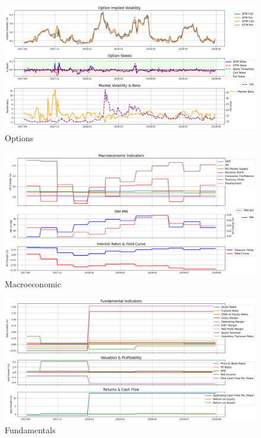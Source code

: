 \documentclass[8pt]{scrartcl}
\begin{document}
\begin{figure}[H]
    \centering
    \includegraphics[width=1\linewidth]{judge_reviews/AMZN_M_gpt-4o-mini/2018-09-01/judge_Option_Implied_Volatility.png}
    \caption{Options}
\end{figure}

\begin{figure}[H]
    \centering
    \includegraphics[width=1\linewidth]{judge_reviews/AMZN_M_gpt-4o-mini/2018-09-01/judge_Macroeconomic_Indicators.png}
    \caption{Macroeconomic}
\end{figure}

\begin{figure}[H]
    \centering
    \includegraphics[width=1\linewidth]{judge_reviews/AMZN_M_gpt-4o-mini/2018-09-01/judge_Fundamental_Indicators.png}
    \caption{Fundamentals}
\end{figure}
\end{document}
